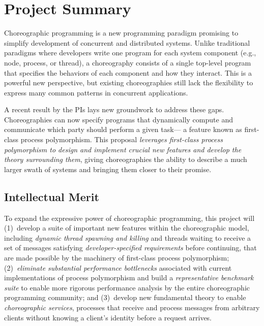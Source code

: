 



\section*{Project Summary}


Choreographic programming is a new programming paradigm promising to simplify development of concurrent and distributed systems.
Unlike traditional paradigms where developers write one program for each system component (e.g., node, process, or thread),
a choreography consists of a single top-level program that specifies the behaviors of each component and how they interact.
This is a powerful new perspective, but existing choreographies still lack the flexibility to express many common patterns in concurrent applications.

A recent result by the PIs lays new groundwork to address these gaps.
Choreographies can now specify programs that dynamically compute and communicate which party should perform a given task---%
a feature known as first-class process polymorphism.
This proposal \emph{leverages first-class process polymorphism to design and implement crucial new features and develop the theory surrounding them},
giving choreographies the ability to describe a much larger swath of systems and bringing them closer to their promise.

\subsection*{Intellectual Merit}

To expand the expressive power of choreographic programming, this project will
(1)~develop a suite of important new features within the choreographic model,
including \emph{dynamic thread spawning and killing}
and threads waiting to receive a set of messages satisfying \emph{developer-specified requirements} before continuing,
that are made possible by the machinery of first-class process polymorphism;
(2)~\emph{eliminate substantial performance bottlenecks} associated with current implementations of process polymorphism
and build a \emph{representative benchmark suite} to enable more rigorous performance analysis by the entire choreographic programming community;
and (3)~develop new fundamental theory to enable \emph{choreographic services},
processes that receive and process messages from arbitrary clients without knowing a client's identity before a request arrives.

